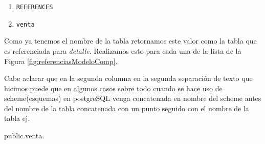 \begin{enumerate}
\item \texttt{REFERENCES}
\item \texttt{venta}
\end{enumerate}
Como ya tenemos el nombre de la tabla retornamos este valor como la tabla que es referenciada para \textit{detalle}. Realizamos esto para cada una de la lista de la Figura \ref{fig:referenciasModeloComp}.

Cabe aclarar que en la segunda columna en la segunda separaci\'on de texto que hicimos puede que en algunos casos sobre todo cuando se hace uso de scheme(esquemas) en postgreSQL venga concatenada en nombre del scheme antes del nombre de la tabla concatenada con un punto seguido con el nombre de la tabla ej.

public.venta.

